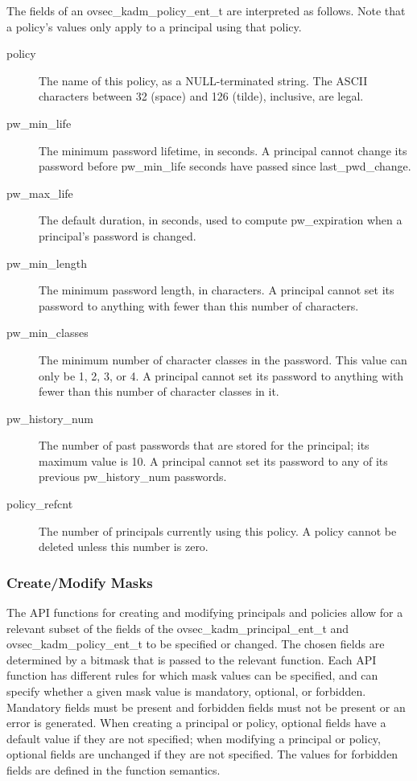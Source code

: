 The fields of an ovsec_kadm_policy_ent_t are interpreted as follows.
Note that a policy's values only apply to a principal using that
policy.

\begin{description}
\item[policy] The name of this policy, as a NULL-terminated string.
The ASCII characters between 32 (space) and 126 (tilde), inclusive,
are legal.

\item[pw_min_life] The minimum password lifetime, in seconds.
A principal cannot change its password before pw_min_life seconds have
passed since last_pwd_change.

\item[pw_max_life] The default duration, in seconds, used to compute
pw_expiration when a principal's password is changed.

\item[pw_min_length] The minimum password length, in characters.  A
principal cannot set its password to anything with fewer than this
number of characters.

\item[pw_min_classes] The minimum number of character classes in the
password.  This value can only be 1, 2, 3, or 4.  A principal cannot
set its password to anything with fewer than this number of character
classes in it.

\item[pw_history_num] The number of past passwords that are
stored for the principal; its maximum value is 10.  A principal cannot
set its password to any of its previous pw_history_num passwords.

\item[policy_refcnt]  The number of principals currently using this policy.
A policy cannot be deleted unless this number is zero.
\end{description}

\subsubsection{Create/Modify Masks}
\label{sec:masks}

The API functions for creating and modifying principals and policies
allow for a relevant subset of the fields of the
ovsec_kadm_principal_ent_t and ovsec_kadm_policy_ent_t to be specified
or changed.  The chosen fields are determined by a bitmask that is
passed to the relevant function.  Each API function has different
rules for which mask values can be specified, and can specify whether
a given mask value is mandatory, optional, or forbidden.  Mandatory
fields must be present and forbidden fields must not be present or an
error is generated.  When creating a principal or policy, optional
fields have a default value if they are not specified; when modifying
a principal or policy, optional fields are unchanged if they are not
specified.  The values for forbidden fields are defined in the
function semantics.

